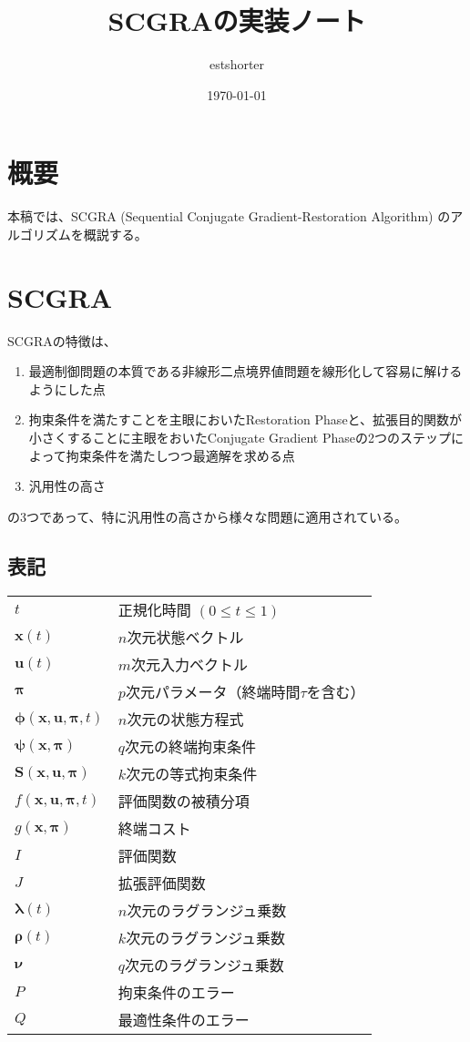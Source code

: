 \documentclass[a4paper]{bxjsarticle}
\title{SCGRAの実装ノート}
\author{estshorter}
\date{\today}
\begin{document}
	\maketitle

	\section{概要}
	本稿では、SCGRA (Sequential Conjugate Gradient-Restoration Algorithm) のアルゴリズムを概説する。

	\section{SCGRA}
	SCGRAの特徴は、
		\begin{enumerate}
			\item 最適制御問題の本質である非線形二点境界値問題を線形化して容易に解けるようにした点
			\item 拘束条件を満たすことを主眼においたRestoration Phaseと、拡張目的関数が小さくすることに主眼をおいたConjugate Gradient Phaseの2つのステップによって拘束条件を満たしつつ最適解を求める点
			\item 汎用性の高さ
		\end{enumerate}
	の3つであって、特に汎用性の高さから様々な問題に適用されている。
	\subsection{表記}
		\begin{tabular}{ll}
		$t$ 		 & 正規化時間 $(0\leq t \leq 1)$ \\
		$\bm{x}(t)$& $n$次元状態ベクトル\\ 
		$\bm{u}(t)$&  $m$次元入力ベクトル \\ 
		$\bm{\pi}$& $p$次元パラメータ（終端時間$\tau$を含む） \\ 
		$\bm{\phi}(\bm{x},\bm{u},\bm{\pi},t)$ &  $n$次元の状態方程式 \\ 
		$\bm{\psi}(\bm{x},\bm{\pi})$& $q$次元の終端拘束条件 \\ 
		$\bm{S}(\bm{x},\bm{u},\bm{\pi})$ & $k$次元の等式拘束条件\\
		$f(\bm{x},\bm{u},\bm{\pi},t)$ & 評価関数の被積分項 \\
		$g(\bm{x,}\bm{\pi})$ & 終端コスト \\
		$I$ & 評価関数 \\
		$J$ & 拡張評価関数 \\
		$\bm{\lambda}(t) $&$n$次元のラグランジュ乗数 \\
		$\bm{\rho}(t)$ & $k$次元のラグランジュ乗数\\
		$\bm{\nu}$ & $q$次元のラグランジュ乗数 \\
		$P$ & 拘束条件のエラー \\
		$Q$ & 最適性条件のエラー 
		\end{tabular} 
\end{document}
